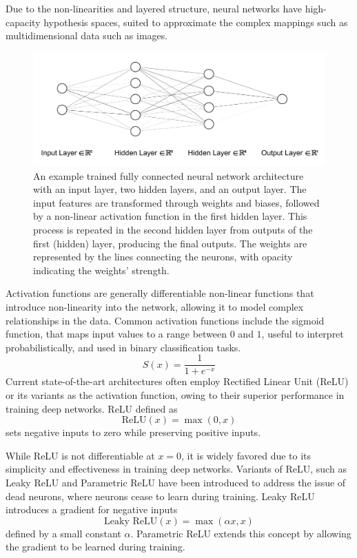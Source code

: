 Due to the non-linearities and layered structure, neural networks have high-capacity hypothesis spaces, suited to approximate the complex mappings such as multidimensional data such as images. 

\begin{figure}[h]
    \centering
    \includegraphics[width=1\linewidth]{images/simple_nn_architecture.pdf}
    \caption{An example trained fully connected neural network architecture with an input layer, two hidden layers, and an output layer. The input features are transformed through weights and biases, followed by a non-linear activation function in the first hidden layer. This process is repeated in the second hidden layer from outputs of the first (hidden) layer, producing the final outputs. The weights are represented by the lines connecting the neurons, with opacity indicating the weights' strength.}
    \label{fig:simple-nn-architecture}
\end{figure}

Activation functions are generally differentiable non-linear functions that introduce non-linearity into the network, allowing it to model complex relationships in the data. Common activation functions include the sigmoid function, that maps input values to a range between $0$ and $1$, useful to interpret probabilistically, and used in binary classification tasks. 
\begin{equation}
    S(x) = \frac{1}{1 + e^{-x}}
\end{equation}
Current state-of-the-art architectures often employ Rectified Linear Unit (ReLU) or its variants as the activation function, owing to their superior performance in training deep networks. ReLU defined as
\begin{equation}
    \text{ReLU}(x) = \max(0, x)
\end{equation}
sets negative inputs to zero while preserving positive inputs.

While ReLU is not differentiable at $x = 0$, it is widely favored due to its simplicity and effectiveness in training deep networks. Variants of ReLU, such as Leaky ReLU and Parametric ReLU have been introduced to address the issue of dead neurons, where neurons cease to learn during training. Leaky ReLU introduces a gradient for negative inputs
\begin{equation}\label{eq:leaky-relu}
    \text{Leaky ReLU}(x) = \max(\alpha x, x)
\end{equation}
defined by a small constant $\alpha$. Parametric ReLU extends this concept by allowing the gradient to be learned during training.

